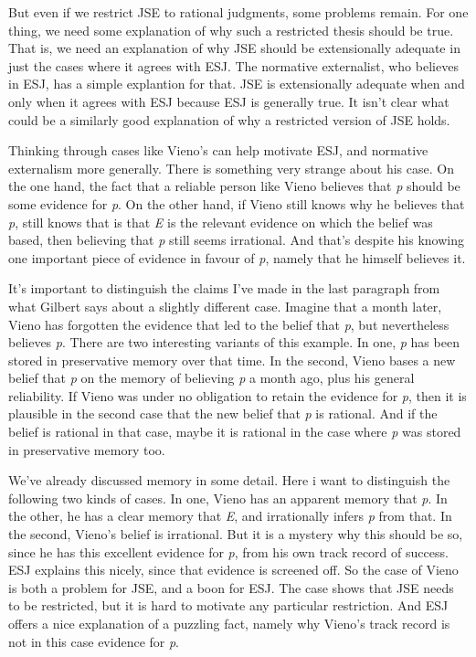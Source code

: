 But even if we restrict JSE to rational judgments, some problems remain. For one thing, we need some explanation of why such a restricted thesis should be true. That is, we need an explanation of why JSE should be extensionally adequate in just the cases where it agrees with ESJ. The normative externalist, who believes in ESJ, has a simple explantion for that. JSE is extensionally adequate when and only when it agrees with ESJ because ESJ is generally true. It isn't clear what could be a similarly good explanation of why a restricted version of JSE holds.

Thinking through cases like \gls{Vieno}'s can help motivate ESJ, and normative externalism more generally. There is something very strange about his case. On the one hand, the fact that a reliable person like \gls{Vieno} believes that \emph{p} should be some evidence for \emph{p}. On the other hand, if \gls{Vieno} still knows why he believes that \emph{p}, still knows that is that \emph{E} is the relevant evidence on which the belief was based, then believing that \emph{p} still seems irrational. And that's despite his knowing one important piece of evidence in favour of \emph{p}, namely that he himself believes it.

It's important to distinguish the claims I've made in the last paragraph from what Gilbert \citet{Harman1986} says about a slightly different case. Imagine that a month later, \gls{Vieno} has forgotten the evidence that led to the belief that \emph{p}, but nevertheless believes \emph{p}. There are two interesting variants of this example. In one, \emph{p} has been stored in preservative memory over that time. In the second, \gls{Vieno} bases a new belief that \emph{p} on the memory of believing \emph{p} a month ago, plus his general reliability. If \gls{Vieno} was under no obligation to retain the evidence for \emph{p}, then it is plausible in the second case that the new belief that \emph{p} is rational. And if the belief is rational in that case, maybe it is rational in the case where \emph{p} was stored in preservative memory too.

We've already discussed memory in some detail. Here i want to distinguish the following two kinds of cases. In one, \gls{Vieno} has an apparent memory that \emph{p}. In the other, he has a clear memory that \emph{E}, and irrationally infers \emph{p} from that. In the second, \gls{Vieno}'s belief is irrational. But it is a mystery why this should be so, since he has this excellent evidence for \emph{p}, from his own track record of success. ESJ explains this nicely, since that evidence is screened off. So the case of \gls{Vieno} is both a problem for JSE, and a boon for ESJ. The case shows that JSE needs to be restricted, but it is hard to motivate any particular restriction. And ESJ offers a nice explanation of a puzzling fact, namely why \gls{Vieno}'s track record is not in this case evidence for \emph{p}.

